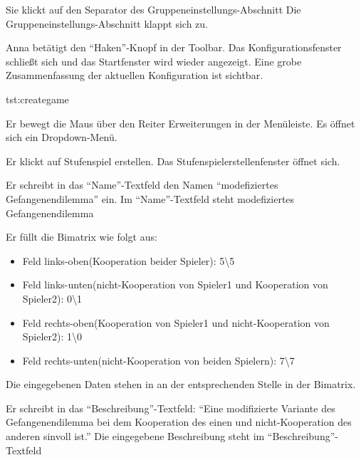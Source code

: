 \documentclass[parskip=full,11pt]{scrartcl}
\begin{document}
{Sie klickt auf den Separator des Gruppeneinstellungs-Abschnitt}
{Die Gruppeneinstellungs-Abschnitt klappt sich zu.}

{Anna betätigt den \enquote{Haken}-Knopf in der Toolbar.}
{Das Konfigurationsfenster schließt sich und das Startfenster wird wieder angezeigt. Eine grobe Zusammenfassung der aktuellen Konfiguration ist sichtbar.}

{tst:creategame}

{Er bewegt die Maus über den Reiter Erweiterungen in der Menüleiste.}
{Es öffnet sich ein Dropdown-Menü.}

{Er klickt auf Stufenspiel erstellen.}
{Das Stufenspielerstellenfenster öffnet sich.}

{Er schreibt in das \enquote{Name}-Textfeld den Namen \enquote{modefiziertes Gefangenendilemma} ein.}
{Im \enquote{Name}-Textfeld steht modefiziertes Gefangenendilemma}

{Er füllt die Bimatrix wie folgt aus:
\begin{itemize}
\item Feld links-oben(Kooperation beider Spieler): 5\textbackslash 5
\item Feld links-unten(nicht-Kooperation von Spieler1 und Kooperation von Spieler2): 0\textbackslash 1
\item Feld rechts-oben(Kooperation von Spieler1 und nicht-Kooperation von Spieler2): 1\textbackslash 0
\item Feld rechts-unten(nicht-Kooperation von beiden Spielern): 7\textbackslash 7
\end{itemize}}
{Die eingegebenen Daten stehen in an der entsprechenden Stelle in der Bimatrix.}

{Er schreibt in das \enquote{Beschreibung}-Textfeld: \enquote{Eine modifizierte Variante des Gefangenendilemma bei dem Kooperation des einen und nicht-Kooperation des anderen sinvoll ist.}}
{Die eingegebene Beschreibung steht im \enquote{Beschreibung}-Textfeld}
\end{document}
